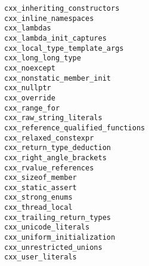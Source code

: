 \documentclass{article}
\newcommand{\cmakecxxfeature}[1]{\lstinline{#1}}
\begin{document}
\begin{minipage}[t]{0.18\linewidth}
\cmakecxxfeature{cxx_inheriting_constructors}\\
\cmakecxxfeature{cxx_inline_namespaces}\\
\cmakecxxfeature{cxx_lambdas}\\
\cmakecxxfeature{cxx_lambda_init_captures}\\
\cmakecxxfeature{cxx_local_type_template_args}\\
\cmakecxxfeature{cxx_long_long_type}\\
\cmakecxxfeature{cxx_noexcept}\\
\cmakecxxfeature{cxx_nonstatic_member_init}\\
\cmakecxxfeature{cxx_nullptr}\\
\cmakecxxfeature{cxx_override}\\
\cmakecxxfeature{cxx_range_for}\\
\cmakecxxfeature{cxx_raw_string_literals}\\
\cmakecxxfeature{cxx_reference_qualified_functions}\\
\cmakecxxfeature{cxx_relaxed_constexpr}\\
\cmakecxxfeature{cxx_return_type_deduction}\\
\cmakecxxfeature{cxx_right_angle_brackets}\\
\cmakecxxfeature{cxx_rvalue_references}\\
\cmakecxxfeature{cxx_sizeof_member}\\
\cmakecxxfeature{cxx_static_assert}\\
\cmakecxxfeature{cxx_strong_enums}\\
\cmakecxxfeature{cxx_thread_local}\\
\cmakecxxfeature{cxx_trailing_return_types}\\
\cmakecxxfeature{cxx_unicode_literals}\\
\cmakecxxfeature{cxx_uniform_initialization}\\
\cmakecxxfeature{cxx_unrestricted_unions}\\
\cmakecxxfeature{cxx_user_literals}\\
\end{minipage}
\hfill\vline\hfill
\end{document}
